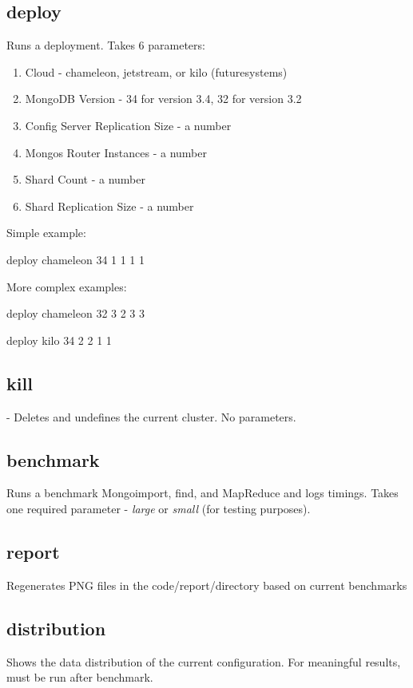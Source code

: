 \documentclass[9pt,twocolumn,twoside]{../../styles/osajnl}
\begin{document}
\subsection{deploy} Runs a deployment.  Takes 6 parameters:


\begin{enumerate}

\item Cloud - chameleon, jetstream, or kilo (futuresystems)
\item MongoDB Version - 34 for version 3.4, 32 for version 3.2
\item Config Server Replication Size - a number
\item Mongos Router Instances - a number
\item Shard Count - a number
\item Shard Replication Size - a number


\end{enumerate}

Simple example:

deploy chameleon 34 1 1 1 1

More complex examples: 

deploy chameleon 32 3 2 3 3

deploy kilo 34 2 2 1 1


\subsection{kill} - Deletes and undefines the current cluster.  No parameters.

\subsection{benchmark} Runs a benchmark Mongoimport, find, and MapReduce and logs timings.  Takes one required parameter - \emph{large} or \emph{small} (for testing purposes).

\subsection{report}  Regenerates PNG files in the code/report/directory based on current benchmarks

\subsection{distribution} Shows the data distribution of the current configuration.  For meaningful results, must be run after benchmark.  
\end{document}
